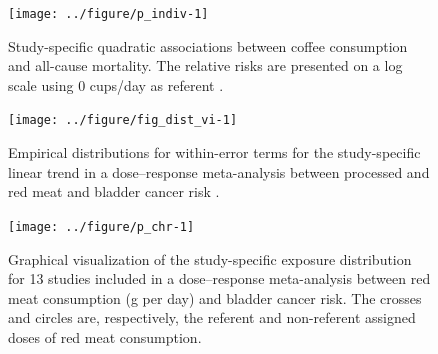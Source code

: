 \documentclass[11pt,a4paper,twoside,openany]{book}\usepackage{knitr}
\begin{document}
{{\begin{knitrout}
\begin{figure}[ht!]
{\centering \texttt{[image: ../figure/p\_indiv-1]} 

}

\caption[Study-specific quadratic associations between coffee consumption and all-cause mortality]{Study-specific quadratic associations between coffee consumption and all-cause mortality. The relative risks are presented on a log scale using 0 cups/day as referent \citep{crippa2016red}.}\label{fig:p_indiv}
\end{figure}


\end{knitrout}

\begin{knitrout}\footnotesize
{}\color{fgcolor}\begin{figure}[ht!]

{\centering \texttt{[image: ../figure/fig\_dist\_vi-1]} 

}

\caption[Empirical distributions for within-error terms for the study-specific linear trend in a dose--response meta-analysis between processed and red meat and bladder cancer risk \citep{crippa2016red}]{Empirical distributions for within-error terms for the study-specific linear trend in a dose--response meta-analysis between processed and red meat and bladder cancer risk \citep{crippa2016red}.}\label{fig:fig_dist_vi}
\end{figure}


\end{knitrout}

\begin{knitrout}\footnotesize
{}\color{fgcolor}\begin{figure}[ht!]

{\centering \texttt{[image: ../figure/p\_chr-1]} 

}

\caption[Graphical visualization of the study-specific exposure distribution for 13 studies included in a dose--response meta-analysis between red meat consumption (g per day) and bladder cancer risk]{Graphical visualization of the study-specific exposure distribution for 13 studies included in a dose--response meta-analysis between red meat consumption (g per day) and bladder cancer risk. The crosses and circles are, respectively, the referent and non-referent assigned doses of red meat consumption.}\label{fig:p_chr}
\end{figure}


\end{knitrout}

}}
\end{document}
